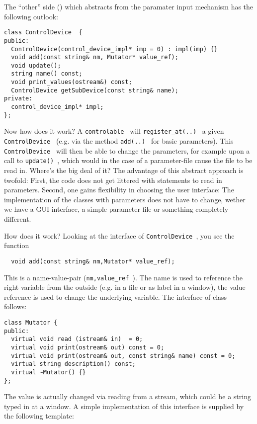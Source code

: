 \documentclass{article}
\begin{document}
The ``other'' side ({\tt {}}) 
which abstracts from the paramater input mechanism
has the following outlook:

\begin{verbatim}
class ControlDevice  {
public:
  ControlDevice(control_device_impl* imp = 0) : impl(imp) {}
  void add(const string& nm, Mutator* value_ref);
  void update();
  string name() const;
  void print_values(ostream&) const;
  ControlDevice getSubDevice(const string& name);
private:
  control_device_impl* impl;
};
\end{verbatim}
    
    Now how does it work? A {\tt  controlable } will {\tt  register\_at(..) }
    a given  {\tt  ControlDevice } (e.g. via the method {\tt  add(..) } for
    basic parameters). This {\tt  ControlDevice } will then be able to change
    the parameters, for example upon a call to {\tt  update() }, which would
    in the case of a parameter-file cause the file to be read in.
    Where's the big deal of it? The advantage of this abstract approach is
    twofold: First, the code does not get littered with statements to read in
    parameters. Second, one gains flexibility in choosing the user interface:
    The implementation of the classes with parameters  does not have to change, 
    wether we have a GUI-interface, a simple parameter file or something 
    completely different.
 
    How does it work? Looking at the interface of {\tt  ControlDevice }, 
    you see the function 
\begin{verbatim}
  void add(const string& nm,Mutator* value_ref);
\end{verbatim}
   This is a name-value-pair ({\tt nm,value\_ref }). The name is used
    to reference the right variable from the outside (e.g. in a file or as
    label in a window), the value reference is used to change the underlying
    variable. The interface of class {\tt  {} } follows:
    
\begin{verbatim}
class Mutator {
public:
  virtual void read (istream& in)  = 0;
  virtual void print(ostream& out) const = 0;
  virtual void print(ostream& out, const string& name) const = 0;
  virtual string description() const;
  virtual ~Mutator() {}
};
\end{verbatim}

    The value is actually changed via reading from a stream, which could be a string
    typed in at a window. A simple implementation of this interface is supplied
    by the following template:
\end{document}

